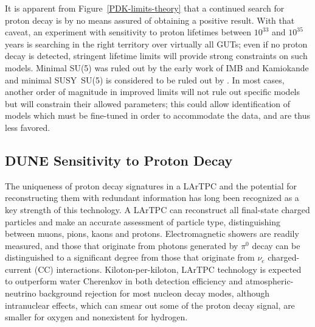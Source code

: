 It is apparent from Figure~\ref{PDK-limits-theory} that a continued
search for proton decay is by no means assured of obtaining a positive
result.  With that caveat, an experiment with sensitivity to proton lifetimes
between $10^{33}$ and $10^{35}$ years is searching in the right territory over
virtually all GUTs; even if no proton decay is detected,
stringent lifetime limits will provide strong constraints on such
models.  Minimal SU(5) was ruled out by the early work of IMB and
Kamiokande and minimal SUSY~SU(5) is considered to be ruled out by \superk.
In most cases, another order of magnitude in improved limits will not rule out
specific models but will constrain their allowed parameters;
this could allow identification of models which must be fine-tuned
in order to accommodate the data, and are thus less favored.

\subsection{DUNE Sensitivity to Proton Decay}

%

The uniqueness of proton decay signatures in a
LArTPC and the potential for reconstructing them with redundant
information has long been recognized as a key strength of this
technology. A LArTPC can reconstruct all final-state charged
particles and make an accurate assessment of particle type,
distinguishing between muons, pions, kaons and
protons. Electromagnetic showers are readily measured, and those that
originate from photons generated by $\pi^0$ decay can be distinguished
to a significant degree from those that originate from $\nu_e$ charged-current (CC)
 interactions.  Kiloton-per-kiloton, LArTPC technology
is expected to outperform water Cherenkov in both detection efficiency
and atmospheric-neutrino background rejection for most nucleon decay
modes, although intranuclear effects, which can smear out some of the
proton decay signal, are smaller for oxygen and nonexistent for
hydrogen.

